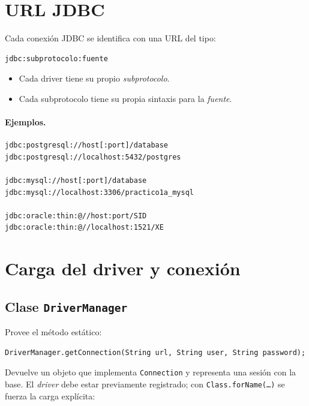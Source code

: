 \documentclass[11pt,a4paper]{article}
\begin{document}
\section{URL JDBC}

Cada conexión JDBC se identifica con una URL del tipo:

\begin{lstlisting}
jdbc:subprotocolo:fuente
\end{lstlisting}

\begin{itemize}
    \item Cada driver tiene su propio \emph{subprotocolo}.
    \item Cada subprotocolo tiene su propia sintaxis para la
    \emph{fuente}.
\end{itemize}

\paragraph{Ejemplos.}

\begin{lstlisting}
jdbc:postgresql://host[:port]/database
jdbc:postgresql://localhost:5432/postgres

jdbc:mysql://host[:port]/database
jdbc:mysql://localhost:3306/practico1a_mysql

jdbc:oracle:thin:@//host:port/SID
jdbc:oracle:thin:@//localhost:1521/XE
\end{lstlisting}

\section{Carga del driver y conexión}

\subsection*{Clase \texttt{DriverManager}}

Provee el método estático:

\begin{lstlisting}
DriverManager.getConnection(String url, String user, String password);
\end{lstlisting}

Devuelve un objeto que implementa \texttt{Connection} y representa
una sesión con la base. El \emph{driver} debe estar previamente
registrado; con \texttt{Class.forName(\dots)} se fuerza la carga
explícita:
\end{document}
